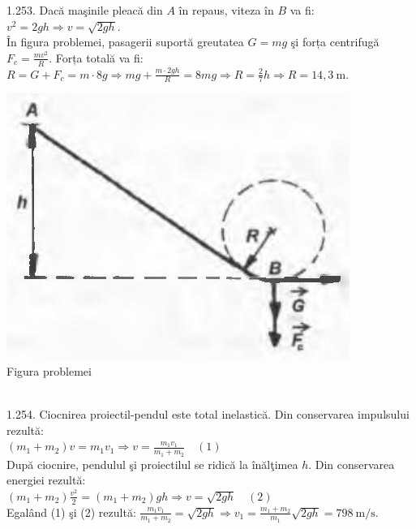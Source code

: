 1.253. Dacă maşinile pleacă din $A$ în repaus, viteza în $B$ va fi:\\ $v^{2}=2 g h \Rightarrow v=\sqrt{2 g h}$.\\ În figura problemei, pasagerii suportă greutatea $G=m g$ şi forța centrifugă $F_{c}=\frac{m v^{2}}{R}$. Forța totală va fi:\\ $R=G+F_{c}=m \cdot 8 g \Rightarrow m g+\frac{m \cdot 2 g h}{R}=8 m g \Rightarrow R=\frac{2}{7} h \Rightarrow R=14,3 \mathrm{~m}$.\\ \begin{center} \includegraphics[width=0.4\linewidth]{images/2025_07_01_5b3ff9fa0d508c8e9f17g-252}\\ Figura problemei \end{center}\\

1.254. Ciocnirea proiectil-pendul este total inelastică. Din conservarea impulsului rezultă:\\ $\left(m_{1}+m_{2}\right) v=m_{1} v_{1} \Rightarrow v=\frac{m_{1} v_{1}}{m_{1}+m_{2}} \quad (1)$\\ După ciocnire, pendulul şi proiectilul se ridică la înălţimea $h$. Din conservarea energiei rezultă:\\ $\left(m_{1}+m_{2}\right) \frac{v^{2}}{2}=\left(m_{1}+m_{2}\right) g h \Rightarrow v=\sqrt{2 g h} \quad (2)$\\ Egalând (1) şi (2) rezultă: $\frac{m_{1} v_{1}}{m_{1}+m_{2}}=\sqrt{2 g h} \Rightarrow v_{1}=\frac{m_{1}+m_{2}}{m_{1}} \sqrt{2 g h}=798 \mathrm{~m} / \mathrm{s}$.\\

